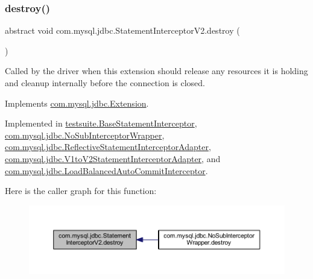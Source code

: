 \subsubsection{\texorpdfstring{destroy()}{destroy()}}
{\footnotesize\ttfamily abstract void com.\+mysql.\+jdbc.\+Statement\+Interceptor\+V2.\+destroy (\begin{DoxyParamCaption}{ }\end{DoxyParamCaption})\hspace{0.3cm}{\ttfamily [abstract]}}

Called by the driver when this extension should release any resources it is holding and cleanup internally before the connection is closed. 

Implements \mbox{\hyperlink{interfacecom_1_1mysql_1_1jdbc_1_1_extension_a7d9644de305efed5df71f3fcc7cc1772}{com.\+mysql.\+jdbc.\+Extension}}.



Implemented in \mbox{\hyperlink{classtestsuite_1_1_base_statement_interceptor_ad60c14de4fc7503095f6dd609f34a95a}{testsuite.\+Base\+Statement\+Interceptor}}, \mbox{\hyperlink{classcom_1_1mysql_1_1jdbc_1_1_no_sub_interceptor_wrapper_ae579d5fb41efef1fff171752d736d4f5}{com.\+mysql.\+jdbc.\+No\+Sub\+Interceptor\+Wrapper}}, \mbox{\hyperlink{classcom_1_1mysql_1_1jdbc_1_1_reflective_statement_interceptor_adapter_aa04ad6c4f60c2b7339f5dcb07ba9407a}{com.\+mysql.\+jdbc.\+Reflective\+Statement\+Interceptor\+Adapter}}, \mbox{\hyperlink{classcom_1_1mysql_1_1jdbc_1_1_v1to_v2_statement_interceptor_adapter_adca046793aea90f93e607ca0c8e7f34b}{com.\+mysql.\+jdbc.\+V1to\+V2\+Statement\+Interceptor\+Adapter}}, and \mbox{\hyperlink{classcom_1_1mysql_1_1jdbc_1_1_load_balanced_auto_commit_interceptor_aca69669db95231d8c2fff5800b62c7f7}{com.\+mysql.\+jdbc.\+Load\+Balanced\+Auto\+Commit\+Interceptor}}.

Here is the caller graph for this function\+:
\nopagebreak
\begin{figure}[H]
\begin{center}
\leavevmode
\includegraphics[width=350pt]{interfacecom_1_1mysql_1_1jdbc_1_1_statement_interceptor_v2_a00bfb3d3f7b81e16a9cdf4784150c3f7_icgraph}
\end{center}
\end{figure}
\mbox{\label{interfacecom_1_1mysql_1_1jdbc_1_1_statement_interceptor_v2_a36f03c5f5b1755d48549862d5b6c627f}} 
